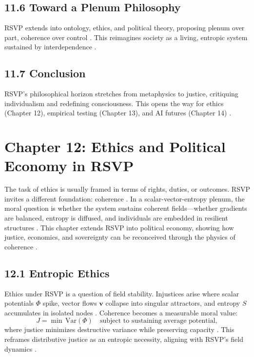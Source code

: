 \documentclass[12pt]{article}
\begin{document}
{{\subsection*{11.6 Toward a Plenum Philosophy}

RSVP extends into ontology, ethics, and political theory, proposing plenum over part, coherence over control \citep{deleuze1987}. This reimagines society as a living, entropic system sustained by interdependence \citep{ortega1957}.

\subsection*{11.7 Conclusion}

RSVP’s philosophical horizon stretches from metaphysics to justice, critiquing individualism and redefining consciousness. This opens the way for ethics (Chapter 12), empirical testing (Chapter 13), and AI futures (Chapter 14) \citep{whitehead1978}.

\section*{Chapter 12: Ethics and Political Economy in RSVP}

The task of ethics is usually framed in terms of rights, duties, or outcomes. RSVP invites a different foundation: coherence \citep{whitehead1978}. In a scalar-vector-entropy plenum, the moral question is whether the system sustains coherent fields—whether gradients are balanced, entropy is diffused, and individuals are embedded in resilient structures \citep{ortega1957}. This chapter extends RSVP into political economy, showing how justice, economics, and sovereignty can be reconceived through the physics of coherence \citep{deleuze1987}.

\subsection*{12.1 Entropic Ethics}

Ethics under RSVP is a question of field stability. Injustices arise where scalar potentials \(\Phi\) spike, vector flows \(\mathbf{v}\) collapse into singular attractors, and entropy \(S\) accumulates in isolated nodes \citep{shannon1948}. Coherence becomes a measurable moral value:
\[
J = \min \, \mathrm{Var}(\Phi) \quad \text{subject to sustaining average potential},
\]
where justice minimizes destructive variance while preserving capacity \citep{whitehead1978}. This reframes distributive justice as an entropic necessity, aligning with RSVP’s field dynamics \citep{gromov1999}.

}}
\end{document}
